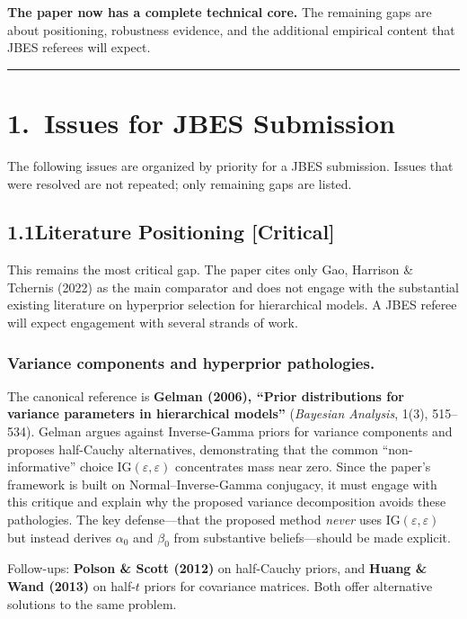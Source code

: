 \documentclass[12pt,a4paper]{article}
\begin{document}
\textbf{The paper now has a complete technical core.}  The remaining gaps are
about positioning, robustness evidence, and the additional empirical content
that JBES referees will expect.

\vspace{0.5em}
\hrule
\vspace{0.5em}

\section{1.\ Issues for JBES Submission}

The following issues are organized by priority for a JBES submission.  Issues
that were resolved are not repeated; only remaining gaps are listed.

\subsection{1.1\quad Literature Positioning [Critical]}

This remains the most critical gap.  The paper cites only Gao, Harrison \&
Tchernis (2022) as the main comparator and does not engage with the substantial
existing literature on hyperprior selection for hierarchical models.  A JBES
referee will expect engagement with several strands of work.

\subsubsection{Variance components and hyperprior pathologies.}

The canonical reference is \textbf{Gelman (2006), ``Prior distributions for
variance parameters in hierarchical models''} (\textit{Bayesian Analysis},
1(3), 515--534).  Gelman argues against Inverse-Gamma priors for variance
components and proposes half-Cauchy alternatives, demonstrating that the common
``non-informative'' choice $\text{IG}(\varepsilon, \varepsilon)$ concentrates
mass near zero.  Since the paper's framework is built on Normal--Inverse-Gamma
conjugacy, it must engage with this critique and explain why the proposed
variance decomposition avoids these pathologies.  The key defense---that the
proposed method \emph{never} uses $\text{IG}(\varepsilon, \varepsilon)$ but
instead derives $\alpha_0$ and $\beta_0$ from substantive beliefs---should be
made explicit.

Follow-ups: \textbf{Polson \& Scott (2012)} on half-Cauchy priors, and
\textbf{Huang \& Wand (2013)} on half-$t$ priors for covariance matrices.
Both offer alternative solutions to the same problem.
\end{document}
